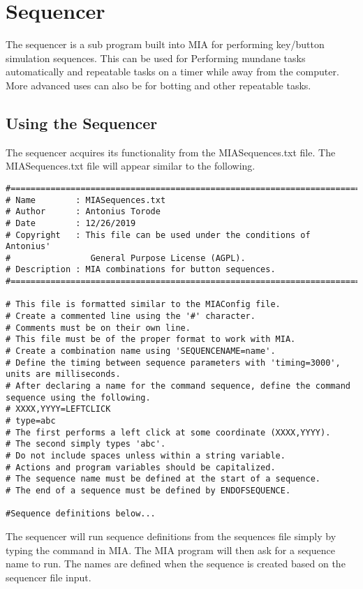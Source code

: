 \chapter{Sequencer} \label{sequencer}
\pagestyle{fancy}

The sequencer is a sub program built into MIA for performing key/button simulation sequences. This can be used for Performing mundane tasks automatically and repeatable tasks on a timer while away from the computer. More advanced uses can also be for botting and other repeatable tasks.

\section{Using the Sequencer}

The sequencer acquires its functionality from the MIASequences.txt file. The MIASequences.txt file will appear similar to the following.

\begin{lstlisting}
#============================================================================
# Name        : MIASequences.txt
# Author      : Antonius Torode
# Date        : 12/26/2019
# Copyright   : This file can be used under the conditions of Antonius' 
#				 General Purpose License (AGPL).
# Description : MIA combinations for button sequences.
#============================================================================

# This file is formatted similar to the MIAConfig file.
# Create a commented line using the '#' character. 
# Comments must be on their own line.
# This file must be of the proper format to work with MIA.
# Create a combination name using 'SEQUENCENAME=name'.
# Define the timing between sequence parameters with 'timing=3000', units are milliseconds.
# After declaring a name for the command sequence, define the command sequence using the following.
# XXXX,YYYY=LEFTCLICK
# type=abc
# The first performs a left click at some coordinate (XXXX,YYYY).
# The second simply types 'abc'.
# Do not include spaces unless within a string variable. 
# Actions and program variables should be capitalized.
# The sequence name must be defined at the start of a sequence.
# The end of a sequence must be defined by ENDOFSEQUENCE.

#Sequence definitions below...
\end{lstlisting}

The sequencer will run sequence definitions from the sequences file simply by typing the  command in MIA. The MIA program will then ask for a sequence name to run. The names are defined when the sequence is created based on the sequencer file input.

